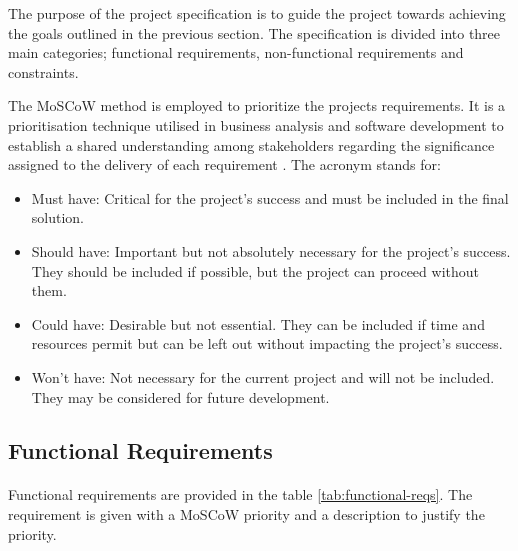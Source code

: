 \documentclass[12pt, conference, final, a4paper, onecolumn, compsoc]{IEEEtran}
\begin{document}
The purpose of the project specification is to guide the project towards
achieving the goals outlined in the previous section. The specification is
divided into three main categories; functional requirements, non-functional
requirements and constraints.

The MoSCoW method is employed to prioritize the projects requirements. It is a
prioritisation technique utilised in business analysis and software development
to establish a shared understanding among stakeholders regarding the
significance assigned to the delivery of each requirement
\citep{moscow-prioritization}. The acronym stands for:

\begin{itemize}
  \item Must have: Critical for the project's success and must be included in
        the final solution.
  \item Should have: Important but not absolutely necessary for the project's
        success. They should be included if possible, but the project can
        proceed without them.
  \item Could have: Desirable but not essential. They can be included if time
        and resources permit but can be left out without impacting the project's
        success.
  \item Won't have: Not necessary for the current project and will not be
        included. They may be considered for future development.
\end{itemize}

\subsection{Functional Requirements}
\paragraph{}

Functional requirements are provided in the table \ref{tab:functional-reqs}. The
requirement is given with a MoSCoW priority and a description to justify the
priority.
\end{document}
